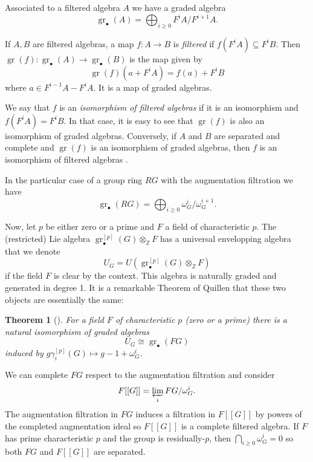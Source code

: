 \documentclass[10pt, oneside]{amsart}
\newcommand{\Z}{\mathbb{Z}} %
\newcommand{\gr}{\operatorname{gr}} %
\newtheorem{theorem}{Theorem}[section]
\theoremstyle{definition}
\theoremstyle{remark}
\theoremstyle{plain}
\begin{document}
Associated to a filtered algebra $A$ we have a graded algebra
$$\gr_\bullet(A)=\bigoplus_{i\geq 0} F^iA/F^{i+1}A.$$

If $A,B$ are filtered algebras, a map $f:A\to B$ is {\sl filtered} if $f(F^iA)\subseteq F^iB$. 
Then $\gr(f):\gr_\bullet(A)\to\gr_\bullet(B)$ is the map given by
$$\gr(f)(a+F^iA)=f(a)+F^iB$$
where $a\in F^{i-1}A-F^{i}A$. It is a map of graded algebras.

We say that $f$ is an {\sl isomorphism of filtered algebras} if it is an isomorphism and $f(F^iA)=F^iB$. In that case, it is easy to see that $\gr(f)$ is also an isomorphism of graded algebras.  Conversely, if $A$ and $B$ are separated and complete and $\gr(f)$ is an isomorphism of graded algebras, then $f$ is an isomorphism of filtered algebras \cite[Lemma 2.4]{SuciuWangT}.




In the particular case of a group ring $RG$ with the augmentation filtration  we have
$$\gr_\bullet(RG)=\bigoplus_{i\geq 0}\omega_G^i/\omega_G^{i+1}.$$

Now, let $p$ be either zero or a prime and $F$ a field of characteristic $p$.  The (restricted) Lie algebra $\gr^{[p]}_\bullet(G)\otimes_\Z F$ has a universal envelopping algebra that we denote 
$$U_G=U(\gr^{[p]}_\bullet(G)\otimes_\Z F)$$
if the field $F$ is clear by the context.
This algebra is naturally graded and generated in degree 1. It is a remarkable Theorem of Quillen that these two objects are essentially the same:


\begin{theorem}[\cite{Quillen}]\label{Quillen} For a field $F$ of characteristic $p$ (zero or a prime) there is a natural isomorphism of graded algebras
$$U_G\cong\gr_\bullet(FG)$$
induced by $g\gamma_i^{[p]}(G)\mapsto g-1+\omega_G^i$.
\end{theorem}



We can complete $FG$ respect to the augmentation filtration and consider
$$F[[G]]=\varprojlim_i FG/\omega_G^i.$$
The augmentation filtration in $FG$ induces a filtration in $F[[G]]$ by powers of the completed augmentation ideal so $F[[G]]$ is a complete filtered algebra. If $F$ has prime characteristic $p$ and the group is residually-$p$, then $\bigcap_{i\geq 0}\omega_G^i=0$ so both $FG$ and $F[[G]]$ are separated.
\end{document}

